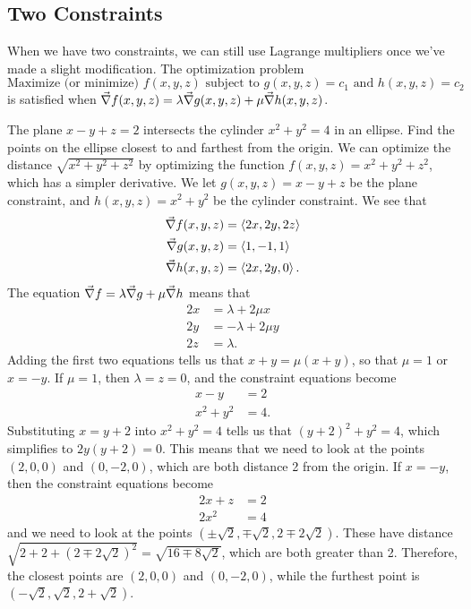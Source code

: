 \subsection{Two Constraints}

When we have two constraints, we can still use Lagrange multipliers once we've made a slight modification.  The optimization problem
\[
 \text{Maximize (or minimize) }f(x,y,z)\text{ subject to }
 g(x,y,z)=c_1\text{ and }h(x,y,z)=c_2
\]
is satisfied when $\vec\nabla f(x,y,z)=\lambda\vec\nabla g(x,y,z)+\mu\vec\nabla h(x,y,z)$.

\begin{example}\label{ex_lang_two_const}%
The plane $x-y+z=2$ intersects the cylinder $x^2+y^2=4$ in an ellipse. Find the points on the ellipse closest to and farthest from the origin.
\solution
We can optimize the distance $\sqrt{x^2+y^2+z^2}$ by optimizing the function $f(x,y,z)=x^2+y^2+z^2$, which has a simpler derivative.  We let $g(x,y,z)=x-y+z$ be the plane constraint, and $h(x,y,z)=x^2+y^2$ be the cylinder constraint.  We see that
\begin{align*}
 \vec\nabla f(x,y,z)&=\left\langle 2x,2y,2z\right\rangle \\
 \vec\nabla g(x,y,z)&=\left\langle 1,-1,1\right\rangle \\
 \vec\nabla h(x,y,z)&=\left\langle 2x,2y,0\right\rangle.
\end{align*}
The equation $\vec\nabla f=\lambda\vec\nabla g+\mu\vec\nabla h$ means that 
\begin{align*}
 2x&=\lambda+2\mu x\\
 2y&=-\lambda+2\mu y\\
 2z&=\lambda.
\end{align*}
Adding the first two equations tells us that $x+y=\mu(x+y)$, so that $\mu=1$ or $x=-y$.  If $\mu=1$, then $\lambda=z=0$, and the constraint equations become
\begin{align*}
 x-y&=2\\
 x^2+y^2&=4.
\end{align*}
Substituting $x=y+2$ into $x^2+y^2=4$ tells us that $(y+2)^2+y^2=4$,
which simplifies to $2y(y+2)=0$.  This means that we need to look at the points $(2,0,0)$ and $(0,-2,0)$, which are both distance 2 from the origin.  If $x=-y$, then the constraint equations become
\begin{align*}
 2x+z&=2\\
 2x^2&=4
\end{align*}
and we need to look at the points $(\pm\sqrt2,\mp\sqrt2,2\mp2\sqrt2)$.  These have distance
$\sqrt{2+2+(2\mp2\sqrt2)^2}
=\sqrt{16\mp8\sqrt2}$, which are both greater than 2.  Therefore, the closest points are $(2,0,0)$ and $(0,-2,0)$, while the furthest point is $(-\sqrt2,\sqrt2,2+\sqrt2)$.
\end{example}


